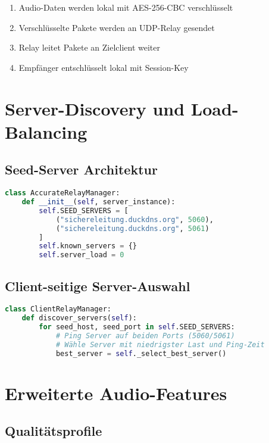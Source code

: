 \documentclass[10pt,a4paper]{article}
\begin{document}
\begin{enumerate}
\item Audio-Daten werden lokal mit AES-256-CBC verschlüsselt
\item Verschlüsselte Pakete werden an UDP-Relay gesendet
\item Relay leitet Pakete an Zielclient weiter
\item Empfänger entschlüsselt lokal mit Session-Key
\end{enumerate}

\section{Server-Discovery und Load-Balancing}

\subsection{Seed-Server Architektur}

\begin{lstlisting}[language=Python,caption=Relay-Manager]
class AccurateRelayManager:
    def __init__(self, server_instance):
        self.SEED_SERVERS = [
            ("sichereleitung.duckdns.org", 5060),
            ("sichereleitung.duckdns.org", 5061)
        ]
        self.known_servers = {}
        self.server_load = 0
\end{lstlisting}

\subsection{Client-seitige Server-Auswahl}

\begin{lstlisting}[language=Python,caption=Server-Discovery]
class ClientRelayManager:
    def discover_servers(self):
        for seed_host, seed_port in self.SEED_SERVERS:
            # Ping Server auf beiden Ports (5060/5061)
            # Wähle Server mit niedrigster Last und Ping-Zeit
            best_server = self._select_best_server()
\end{lstlisting}

\section{Erweiterte Audio-Features}

\subsection{Qualitätsprofile}
\end{document}
